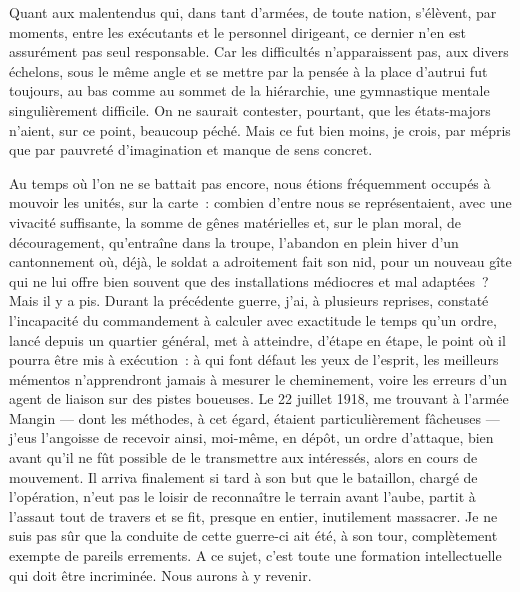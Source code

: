 \documentclass[french,twoside]{book} %
\begin{document}
Quant aux malentendus qui, dans tant d’armées, de toute nation, s’élèvent, par moments, entre les exécutants et le personnel dirigeant, ce dernier n’en est assurément pas seul responsable. Car les difficultés n’apparaissent pas, aux divers échelons, sous le même angle et se mettre par la pensée à la place d’autrui fut toujours, au bas comme au sommet de la hiérarchie, une gymnastique mentale singulièrement difficile. On ne saurait contester, pourtant, que les états-majors n’aient, sur ce point, beaucoup péché. Mais ce fut bien moins, je crois, par mépris que par pauvreté d’imagination et manque de sens concret.\par
  Au temps où l’on ne se battait pas encore, nous étions fréquemment occupés à mouvoir les unités, sur la carte : combien d’entre nous se représentaient, avec une vivacité suffisante, la somme de gênes matérielles et, sur le plan moral, de découragement, qu’entraîne dans la troupe, l’abandon en plein hiver d’un cantonnement où, déjà, le soldat a adroitement fait son nid, pour un nouveau gîte qui ne lui offre bien souvent que des installations médiocres et mal adaptées ? Mais il y a pis. Durant la précédente guerre, j’ai, à plusieurs reprises, constaté l’incapacité du commandement à calculer avec exactitude le temps qu’un ordre, lancé depuis un quartier général, met à atteindre, d’étape en étape, le point où il pourra être mis à exécution : à qui font défaut les yeux de l’esprit, les meilleurs mémentos n’apprendront jamais à mesurer le cheminement, voire les erreurs d’un agent de liaison sur des pistes boueuses. Le 22 juillet 1918, me trouvant à l’armée Mangin — dont les méthodes, à cet égard, étaient particulièrement fâcheuses — j’eus l’angoisse de recevoir ainsi, moi-même, en dépôt, un ordre d’attaque, bien avant qu’il ne fût possible de le transmettre aux intéressés, alors en cours de mouvement. Il arriva finalement si tard à son but que le bataillon, chargé de l’opération, n’eut pas le loisir de reconnaître le terrain avant l’aube, partit à l’assaut tout de travers et se fit, presque en entier, inutilement massacrer. Je ne suis pas sûr que la conduite de cette guerre-ci ait été, à son tour, complètement exempte de pareils errements. A ce sujet, c’est toute une formation intellectuelle qui doit être incriminée. Nous aurons à y revenir.\par
\end{document}
